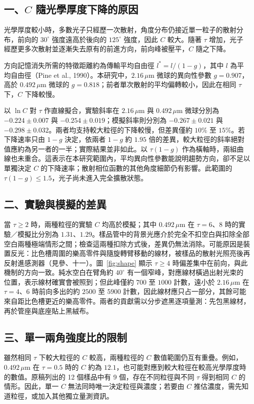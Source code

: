 \subsection*{一、$C$ 隨光學厚度下降的原因}
光學厚度較小時，多數光子只經歷一次散射，角度分布仍接近單一粒子的散射分布，前向的 $30^\circ$ 強度遠高於後向的 $125^\circ$ 強度，因此 $C$ 較大。隨著 $\tau$ 增加，光子經歷更多次散射並逐漸失去原有的前進方向，前向峰被壓平，$C$ 隨之下降。

方向記憶消失所需的特徵距離約為傳輸平均自由徑 $l^*=l/(1-g)$，其中 $l$ 為平均自由徑（Pine et al., 1990）。本研究中，$2.16\,\mu\mathrm{m}$ 微球的異向性參數 $g=0.907$，高於 $0.492\,\mu\mathrm{m}$ 微球的 $g=0.818$；前者單次散射的平均偏轉較小，因此在相同 $\tau$ 下，$C$ 下降較慢。

以 $\ln C$ 對 $\tau$ 作直線擬合，實驗斜率在 $2.16\,\mu\mathrm{m}$ 與 $0.492\,\mu\mathrm{m}$ 微球分別為 $-0.224\pm0.007$ 與 $-0.254\pm0.019$；模擬斜率則分別為 $-0.267\pm0.021$ 與 $-0.298\pm0.032$。兩者均支持較大粒徑的下降較慢，但差異僅約 $10\%$ 至 $15\%$。若下降速率只由 $1-g$ 決定，依兩者 $1-g$ 約 $1.95$ 倍的差異，較大粒徑的斜率絕對值應約為另一者的一半；實際結果並非如此。以 $\tau(1-g)$ 作為橫軸時，兩組曲線也未重合。這表示在本研究範圍內，平均異向性參數能說明趨勢方向，卻不足以單獨決定 $C$ 的下降速率；散射相位函數的其他角度細節仍有影響。此範圍的 $\tau(1-g)\leq1.5$，光子尚未進入完全擴散狀態。

\subsection*{二、實驗與模擬的差異}
當 $\tau\geq2$ 時，兩種粒徑的實驗 $C$ 均高於模擬；其中 $0.492\,\mu\mathrm{m}$ 在 $\tau=6$、$8$ 時的實驗／模擬比分別為 $1.31$、$1.29$。樣品管中的背景光應介於完全不扣空白與扣除全部空白兩種極端情形之間；檢查這兩種扣除方式後，差異仍無法消除。可能原因是裝置反光：比色槽周圍的樂高零件與隨旋轉臂移動的線材，被樣品的散射光照亮後再反射進感測器（見參、十一）。圖~\ref{fig:shape} 顯示 $\tau\geq4$ 時偏差集中在前向，與此機制的方向一致。純水空白在臂角約 $40^\circ$ 有一個窄峰，對應線材橫過出射光束的位置，表示線材確實會被照到；但此峰僅約 $700$ 至 $1000$ 計數，遠小於 $2.16\,\mu\mathrm{m}$ 在 $\tau=4$、$6$ 時前向多出的約 $2500$ 至 $5900$ 計數，因此線材應只占一部分，其餘可能來自距比色槽更近的樂高零件。兩者的貢獻需以分步遮黑逐項量測：先包黑線材，再於管座與底座貼上黑絨布。

\subsection*{三、單一兩角強度比的限制}
雖然相同 $\tau$ 下較大粒徑的 $C$ 較高，兩種粒徑的 $C$ 數值範圍仍互有重疊。例如，$0.492\,\mu\mathrm{m}$ 在 $\tau=0.5$ 時的 $C$ 約為 $12.1$，也可能對應到較大粒徑在較高光學厚度時的數值。原稿列出的 12 個樣品中有 9 個，存在不同粒徑與不同 $\tau$ 得到相同 $C$ 的情形。因此，單一 $C$ 無法同時唯一決定粒徑與濃度；若要由 $C$ 推估濃度，需先知道粒徑，或加入其他獨立量測資訊。


